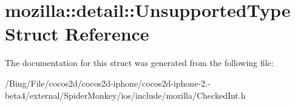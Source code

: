 \hypertarget{structmozilla_1_1detail_1_1_unsupported_type}{\section{mozilla\-:\-:detail\-:\-:Unsupported\-Type Struct Reference}
\label{structmozilla_1_1detail_1_1_unsupported_type}
}


The documentation for this struct was generated from the following file\-:\begin{DoxyCompactItemize}
\item 
/\-Bing/\-File/cocos2d/cocos2d-\/iphone/cocos2d-\/iphone-\/2.-\/beta4/external/\-Spider\-Monkey/ios/include/mozilla/Checked\-Int.\-h\end{DoxyCompactItemize}
